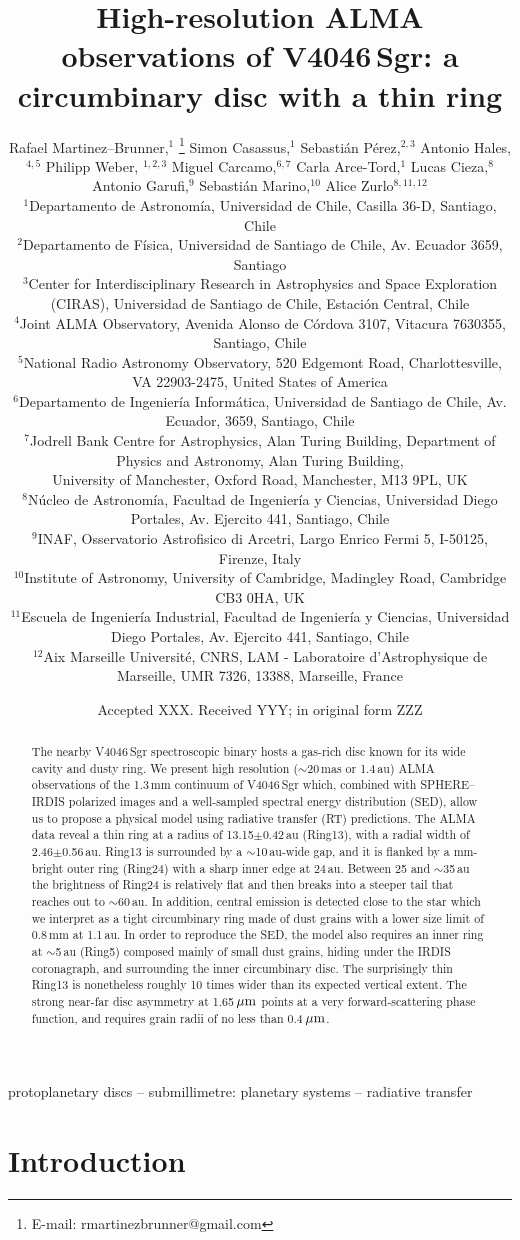 \documentclass[fleqn,usenatbib,useAMS]{mnras}
\title[High-resolution ALMA observations of V4046\,Sgr]{High-resolution ALMA observations of V4046\,Sgr: a circumbinary disc with a thin ring}
\author[R. Martinez--Brunner et al.]{Rafael Martinez--Brunner,$^{1}$
\thanks{E-mail: rmartinezbrunner@gmail.com}
Simon Casassus,$^{1}$
Sebasti\'an P\'erez,$^{2,3}$
Antonio Hales,$^{4,5}$
Philipp Weber, $^{1,2,3}$ \newauthor
Miguel Carcamo,$^{6,7}$
Carla Arce-Tord,$^{1}$
Lucas Cieza,$^{8}$
Antonio Garufi,$^{9}$
Sebasti\'an Marino,$^{10}$
Alice Zurlo$^{8,11,12}$
\\
$^{1}$Departamento de Astronom\'ia, Universidad de Chile, Casilla 36-D, Santiago, Chile\\
$^{2}$Departamento de F\'isica, Universidad de Santiago de Chile, Av. Ecuador 3659, Santiago\\
$^{3}$Center for Interdisciplinary Research in Astrophysics and Space Exploration (CIRAS), Universidad de Santiago de Chile, Estaci\'on Central, Chile \\
$^{4}$Joint ALMA Observatory, Avenida Alonso de C\'ordova 3107, Vitacura 7630355, Santiago, Chile \\
$^{5}$National Radio Astronomy Observatory, 520 Edgemont Road, Charlottesville, VA 22903-2475, United States of America \\
$^{6}$Departamento de Ingenier\'ia Inform\'atica, Universidad de Santiago de Chile, Av. Ecuador, 3659, Santiago, Chile\\
$^{7}$Jodrell Bank Centre for Astrophysics, Alan Turing Building, Department of Physics and Astronomy, Alan Turing Building,\\ University of Manchester, Oxford Road, Manchester, M13 9PL, UK \\
$^{8}$N\'ucleo de Astronom\'ia, Facultad de Ingenier\'ia y Ciencias, Universidad Diego Portales, Av. Ejercito 441, Santiago, Chile\\
$^{9}$INAF, Osservatorio Astrofisico di Arcetri, Largo Enrico Fermi 5, I-50125, Firenze, Italy\\
$^{10}$Institute of Astronomy, University of Cambridge, Madingley Road, Cambridge CB3 0HA, UK\\
$^{11}$Escuela de Ingenier\'ia Industrial, Facultad de Ingenier\'ia y Ciencias, Universidad Diego Portales, Av. Ejercito 441, Santiago, Chile \\
$^{12}$Aix Marseille Universit\'e, CNRS, LAM - Laboratoire d'Astrophysique de Marseille, UMR 7326, 13388, Marseille, France  \\
}
\date{Accepted XXX. Received YYY; in original form ZZZ}
\begin{document}
\label{firstpage}
\pagerange{\pageref{firstpage}--\pageref{lastpage}}
\maketitle

\begin{abstract}
    The nearby V4046\,Sgr spectroscopic binary hosts a gas-rich disc known for its wide cavity and dusty ring. We present high resolution ($\sim$20\,mas or 1.4\,au) ALMA observations of the 1.3\,mm continuum of V4046\,Sgr which, combined with SPHERE--IRDIS polarized images and a well-sampled spectral energy distribution (SED), allow us to propose a physical model using radiative transfer (RT) predictions. The ALMA data reveal a thin ring at a radius of 13.15$\pm$0.42\,au (Ring13), with a radial width of 2.46$\pm$0.56\,au. Ring13 is surrounded by a $\sim$10\,au-wide gap, and it is flanked by a mm-bright outer ring (Ring24) with a sharp inner edge at 24\,au. Between 25 and $\sim$35\,au the brightness of Ring24 is relatively flat and then breaks into a steeper tail that reaches out to $\sim$60\,au. In addition, central emission is detected close to the star which we interpret as a tight circumbinary ring made of dust grains with a lower size limit of 0.8\,mm at 1.1\,au. In order to reproduce the SED, the model also requires an inner ring at $\sim$5\,au (Ring5) composed mainly of small dust grains, hiding under the IRDIS coronagraph, and surrounding the inner circumbinary disc. The surprisingly thin Ring13 is nonetheless roughly 10 times wider than its expected vertical extent. The strong near-far disc asymmetry at 1.65\,$\hbox{$\mu$m}$ points at a very forward-scattering phase function, and requires grain radii of no less than 0.4\,$\hbox{$\mu$m}$.
\end{abstract}

\begin{keywords}
 protoplanetary discs -- submillimetre: planetary systems -- radiative transfer
\end{keywords}



\section{Introduction} \label{sec:Introduction}
\end{document}
